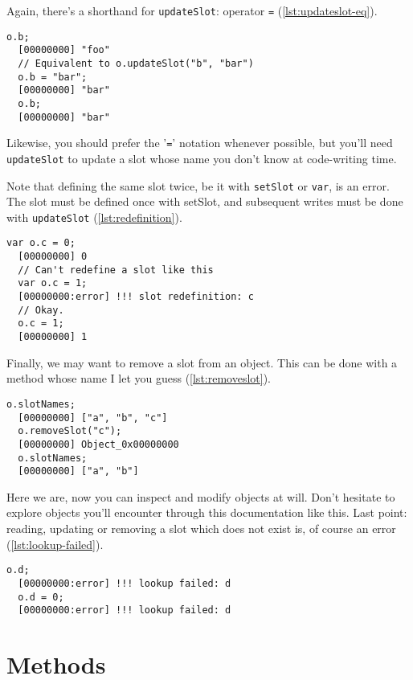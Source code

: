 \documentclass[openright,twoside,12pt]{report}
\begin{document}
Again, there's a shorthand for \texttt{updateSlot}: operator
\texttt{=} (\autoref{lst:updateslot-eq}).

\begin{lstlisting}[caption=Updating a slot with '\texttt{=}',
  label=lst:updateslot-eq]
  o.b;
  [00000000] "foo"
  // Equivalent to o.updateSlot("b", "bar")
  o.b = "bar";
  [00000000] "bar"
  o.b;
  [00000000] "bar"
\end{lstlisting}

Likewise, you should prefer the '\texttt{=}' notation whenever
possible, but you'll need \texttt{updateSlot} to update a slot whose
name you don't know at code-writing time.

Note that defining the same slot twice, be it with \texttt{setSlot} or
\texttt{var}, is an error. The slot must be defined once with setSlot,
and subsequent writes must be done with \texttt{updateSlot}
(\autoref{lst:redefinition}).

\begin{lstlisting}[caption=Defining a slot twice is an error,
  label=lst:redefinition]
  var o.c = 0;
  [00000000] 0
  // Can't redefine a slot like this
  var o.c = 1;
  [00000000:error] !!! slot redefinition: c
  // Okay.
  o.c = 1;
  [00000000] 1
\end{lstlisting}

Finally, we may want to remove a slot from an object. This can be done
with a method whose name I let you guess (\autoref{lst:removeslot}).

\begin{lstlisting}[caption=Removing a slot, label=lst:removeslot]
  o.slotNames;
  [00000000] ["a", "b", "c"]
  o.removeSlot("c");
  [00000000] Object_0x00000000
  o.slotNames;
  [00000000] ["a", "b"]
\end{lstlisting}

Here we are, now you can inspect and modify objects at will. Don't
hesitate to explore \urbi objects you'll encounter through this
documentation like this. Last point: reading, updating or removing a
slot which does not exist is, of course an error
(\autoref{lst:lookup-failed}).

\begin{lstlisting}[caption=Manipulating existent slot is an error,
  label=lst:lookup-failed]
  o.d;
  [00000000:error] !!! lookup failed: d
  o.d = 0;
  [00000000:error] !!! lookup failed: d
\end{lstlisting}

\section{Methods}
\end{document}
